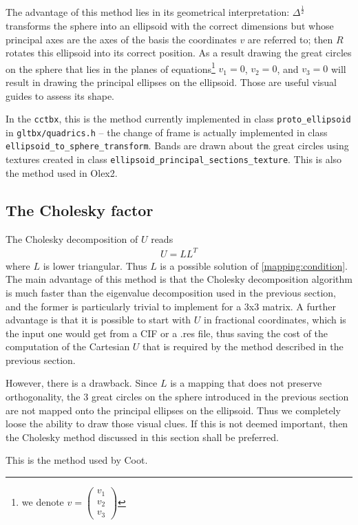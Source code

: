 \documentclass[a4paper,11pt]{article}
\newcommand{\code}[1]{\texttt{#1}}
\begin{document}
The advantage of this method lies in its geometrical interpretation: $\Delta^\frac{1}{2}$ transforms the sphere into an ellipsoid with the correct dimensions but whose principal axes are the axes of the basis the coordinates $v$ are referred to; then $R$ rotates this ellipsoid into its correct position. As a result drawing the great circles on the sphere that lies in the planes of equations\footnote{we denote $v=\begin{pmatrix}
  v_1\\
  v_2\\
  v_3
\end{pmatrix}$} $v_1=0$, $v_2=0$, and $v_3=0$ will result in drawing the principal ellipses on the ellipsoid. Those are useful visual guides to assess its shape.

In the \code{cctbx}, this is the method currently implemented in class \code{proto\_ellipsoid} in \code{gltbx/quadrics.h} -- the change of frame is actually implemented in class \code{ellipsoid_to_sphere_transform}. Bands are drawn about the great circles using textures created in class \code{ellipsoid_principal_sections_texture}. This is also the method used in Olex2.


\subsection{The Cholesky factor}

The Cholesky decomposition of $U$ reads
\begin{align}
  U = L L^T
\end{align}
where $L$ is lower triangular. Thus $L$ is a possible solution of \eqref{mapping:condition}.
The main advantage of this method is that the Cholesky decomposition algorithm is much faster than the eigenvalue decomposition used in the previous section, and the former is particularly trivial to implement for a 3x3 matrix. A further advantage is that it is possible to start with $U$ in fractional coordinates, which is the input one would get from a CIF or a .res file, thus saving the cost of the computation of the Cartesian $U$ that is required by the method described in the previous section.

However, there is a drawback. Since $L$ is a mapping that does not preserve orthogonality, the 3 great circles on the sphere introduced in the previous section are not mapped onto the principal ellipses on the ellipsoid. Thus we completely loose the ability to draw those visual clues. If this is not deemed important, then the Cholesky method discussed in this section shall be preferred.

This is the method used by Coot.
\end{document}
